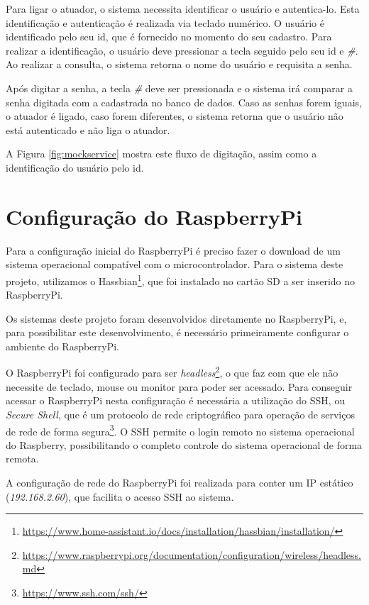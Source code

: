 Para ligar o atuador, o sistema necessita identificar o usuário e autentica-lo. Esta identificação e autenticação é realizada via teclado numérico. O usuário é identificado pelo seu id, que é fornecido no momento do seu cadastro. Para realizar a identificação, o usuário deve pressionar a tecla \textit{\*} seguido pelo seu id e \textit{\#}. Ao realizar a consulta, o sistema retorna o nome do usuário e requisita a senha.

Após digitar a senha, a tecla \textit{\#} deve ser pressionada e o sistema irá comparar a senha digitada com a cadastrada no banco de dados. Caso as senhas forem iguais, o atuador é ligado, caso forem diferentes, o sistema retorna que o usuário não está autenticado e não liga o atuador. 

A Figura \ref{fig:mockservice} mostra este fluxo de digitação, assim como a identificação do usuário pelo id.

\section{Configuração do RaspberryPi} \label{sec:confrasp}

Para a configuração inicial do RaspberryPi é preciso fazer o download de um sistema operacional compatível com o microcontrolador. Para o sistema deste projeto, utilizamos o Hassbian\footnote{\url{https://www.home-assistant.io/docs/installation/hassbian/installation/}}, que foi instalado no cartão SD a ser inserido no RaspberryPi.


Os sistemas deste projeto foram desenvolvidos diretamente no RaspberryPi, e, para possibilitar este desenvolvimento, é necessário primeiramente configurar o ambiente do RaspberryPi.

O RaspberryPi foi configurado para ser \textit{headless}\footnote{\url{https://www.raspberrypi.org/documentation/configuration/wireless/headless.md}}, o que faz com que ele não necessite de teclado, mouse ou monitor para poder ser acessado. Para conseguir acessar o RaspberryPi nesta configuração é necessária a utilização do SSH, ou \textit{Secure Shell}, que é um protocolo de rede criptográfico para operação de serviços de rede de forma segura\footnote{\url{https://www.ssh.com/ssh/}}. O SSH permite o login remoto no sistema operacional do Raspberry, possibilitando o completo controle do sistema operacional de forma remota.

A configuração de rede do RaspberryPi foi realizada para conter um IP estático (\textit{192.168.2.60}), que facilita o acesso SSH ao sistema.

